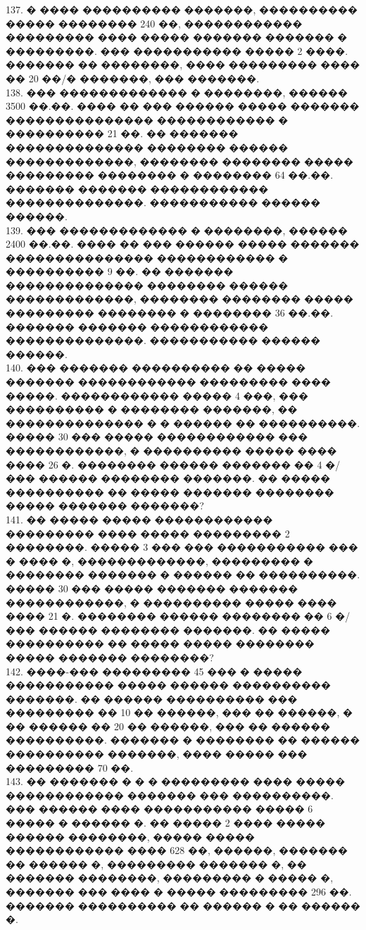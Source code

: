 \documentclass[12pt]{article}
\begin{document}
137. � ���� ���������� �������, ���������� ����� �������� 240 ��, ������������ ��������� ���� ����� ������� ������� � ���������. ��� ����������� ����� 2 ����. ������� �� ��������, ���� ��������� ���� �� 20 ��/� �������, ��� �������.\\
138. ��� ������������� � ��������, ������ 3500 ��.��. ���� �� ��� ������ ����� ������� ��������������� ������������ � ���������� 21 ��. �� ������� �������������� �������� ������ �������������, �������� �������� ����� ��������� �������� � �������� 64 ��.��. ������� ������� ������������ ��������������. ����������� ������ ������.\\
139. ��� ������������� � ��������, ������ 2400 ��.��. ���� �� ��� ������ ����� ������� ��������������� ������������ � ���������� 9 ��. �� ������� �������������� �������� ������ �������������, �������� �������� ����� ��������� �������� � �������� 36 ��.��. ������� ������� ������������ ��������������. ����������� ������ ������.\\
140. ��� ������� ���������� �� ����� ������� ������������ ��������� ���� �����. ������������ ����� 4 ���, ��� ���������� � �������� �������, �� �������������� � � ������ �� ����������. ����� 30 ��� ����� ������������ ��� ������������, � ���������� ����� ���� ���� 26 �. �������� ������ ������� �� 4 �/��� ������ �������� �������. �� ����� ���������� �� ����� ������� �������� ����� ������� �������?\\
141. �� ����� ����� ������������ ��������� ���� ����� ��������� 2 ��������. ����� 3 ��� ��� ����������� ��� � ���� �, �������������, ��������� � �������� ������� � ������ �� ����������. ����� 30 ��� ����� ������� ������� ������������, � ���������� ����� ���� ���� 21 �. �������� ������ �������� �� 6 �/��� ������ �������� �������. �� ����� ���������� �� ����� ����� �������� ����� ������� ��������?\\
142. ����-��� ��������� 45 ��� � ����� ����������� ����� ������ ���������� �������. �� ������ ���������� ��� ��������� �� 10 �� ������, ��� �� ������, � �� ������ �� 20 �� ������, ��� �� ������ ����������. ������� � �������� �� ������ ���������� �������, ���� ����� ��� ��������� 70 ��.\\
143. �� ������� � � � ��������� ���� ����� ������������ ������� ��� ����������. ��� ������ ���� ����������� ����� 6 ����� � ������ �. �� ����� 2 ���� ����� ������ ��������, ����� ����� ������������ ���� 628 ��, ������, ������� �� ������ �, ��������� ������� �, �� ������� ��������, ��������� � ����� �, ������� ��� ���� � ����� ��������� 296 ��. ������� ���������� �� ������ � �� ������ �.\\
\end{document}
